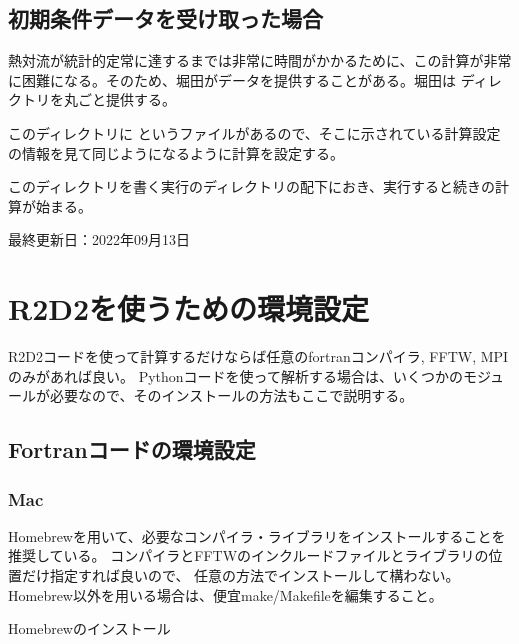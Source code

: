 \documentclass[letterpaper,10pt,dvipdfmx,report]{sphinxmanual}
\begin{document}
\section{初期条件データを受け取った場合}
\label{\detokenize{start:id6}}
\sphinxAtStartPar
熱対流が統計的定常に達するまでは非常に時間がかかるために、この計算が非常に困難になる。そのため、堀田がデータを提供することがある。堀田は  ディレクトリを丸ごと提供する。

\sphinxAtStartPar
このディレクトリに  というファイルがあるので、そこに示されている計算設定の情報を見て同じようになるように計算を設定する。

\sphinxAtStartPar
このディレクトリを書く実行のディレクトリの配下におき、実行すると続きの計算が始まる。

\sphinxAtStartPar
最終更新日：2022年09月13日

\sphinxstepscope


\chapter{R2D2を使うための環境設定}
\label{\detokenize{environment:r2d2}}\label{\detokenize{environment::doc}}
\sphinxAtStartPar
R2D2コードを使って計算するだけならば任意のfortranコンパイラ, FFTW, MPIのみがあれば良い。
Pythonコードを使って解析する場合は、いくつかのモジュールが必要なので、そのインストールの方法もここで説明する。


\section{Fortranコードの環境設定}
\label{\detokenize{environment:fortran}}

\subsection{Mac}
\label{\detokenize{environment:mac}}
\sphinxAtStartPar
Homebrewを用いて、必要なコンパイラ・ライブラリをインストールすることを推奨している。
コンパイラとFFTWのインクルードファイルとライブラリの位置だけ指定すれば良いので、
任意の方法でインストールして構わない。Homebrew以外を用いる場合は、便宜make/Makefileを編集すること。

\sphinxAtStartPar
Homebrewのインストール

\begin{sphinxVerbatim}[commandchars=\\\{\}]
  
\end{sphinxVerbatim}
\end{document}
